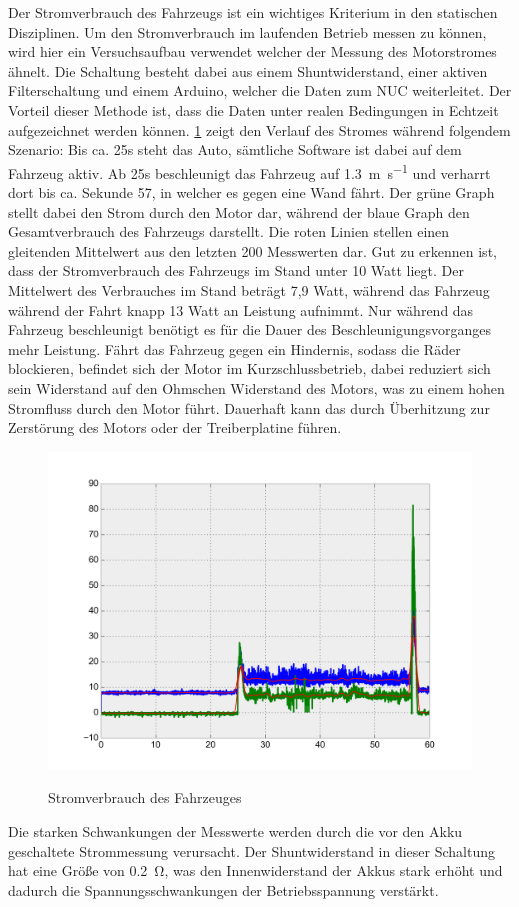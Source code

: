Der Stromverbrauch des Fahrzeugs ist ein wichtiges Kriterium in den statischen Disziplinen. Um den Stromverbrauch im laufenden Betrieb messen zu können, wird hier ein Versuchsaufbau verwendet welcher der Messung des
Motorstromes ähnelt. Die Schaltung besteht dabei aus einem Shuntwiderstand, einer aktiven Filterschaltung und einem Arduino, welcher die Daten zum NUC weiterleitet. Der Vorteil dieser Methode ist, dass die Daten
unter realen Bedingungen in Echtzeit aufgezeichnet werden können. \cref{fig:power_consumption} zeigt den Verlauf des Stromes während folgendem Szenario: Bis ca. 25s steht das Auto, sämtliche Software ist dabei auf 
dem Fahrzeug aktiv. Ab 25s beschleunigt das Fahrzeug auf \SI{1,3}{\metre\per\second} und verharrt dort bis ca. Sekunde 57, in welcher es gegen eine Wand fährt. Der grüne Graph stellt dabei den Strom durch den Motor dar, während
der blaue Graph den Gesamtverbrauch des Fahrzeugs darstellt. Die roten Linien stellen einen gleitenden Mittelwert aus den letzten 200 Messwerten dar. Gut zu erkennen ist, dass der Stromverbrauch des Fahrzeugs im Stand unter 
10 Watt liegt. Der Mittelwert des Verbrauches im Stand beträgt 7,9 Watt, während das Fahrzeug während der Fahrt knapp 13 Watt an Leistung aufnimmt. Nur während das Fahrzeug beschleunigt benötigt es für die Dauer
des Beschleunigungsvorganges mehr Leistung. Fährt das Fahrzeug gegen ein Hindernis, sodass die Räder blockieren, befindet sich der Motor im Kurzschlussbetrieb, dabei reduziert sich sein Widerstand auf den Ohmschen Widerstand
des Motors, was zu einem hohen Stromfluss durch den Motor führt. Dauerhaft kann das durch Überhitzung zur Zerstörung des Motors oder der Treiberplatine führen.


\begin{figure}[H]
\centering
\includegraphics[width=.8\textwidth]{Strom/Power.png}\\
\caption{Stromverbrauch des Fahrzeuges}%
\label{fig:power_consumption}
\end{figure}


Die starken Schwankungen der Messwerte werden durch die vor den Akku geschaltete Strommessung verursacht. Der Shuntwiderstand in dieser Schaltung hat eine Größe von
\SI{0,2}{\ohm}, was den Innenwiderstand der Akkus stark erhöht und dadurch die Spannungsschwankungen der Betriebsspannung verstärkt. 

